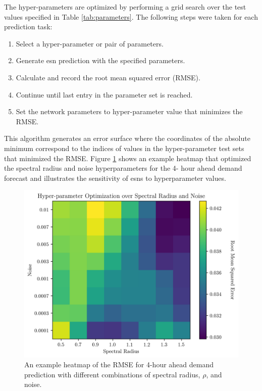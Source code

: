  The hyper-parameters are optimized by performing a grid search over the test
 values specified in Table \ref{tab:parameters}. The following steps were taken
 for each prediction task:
 \begin{enumerate}
   \item Select a hyper-parameter or pair of parameters.
   \item Generate \gls{esn} prediction with the specified parameters.
   \item Calculate and record the root mean squared error (RMSE).
   \item Continue until last entry in the parameter set is reached.
   \item Set the network parameters to hyper-parameter value that minimizes the
   RMSE.
 \end{enumerate}
 This algorithm generates an error surface where the coordinates of the absolute
 minimum correspond to the indices of values in the hyper-parameter test sets
 that minimized the RMSE. Figure \ref{fig:rhoxnoise-demand04} shows an example
 heatmap that optimized the spectral radius and noise hyperparameters for the 4-
 hour ahead demand forecast and illustrates the sensitivity of \glspl{esn} to
 hyperparameter values.

 \begin{figure}[h]
   \includegraphics[width=\columnwidth]{./images/04_demand_rho_noise_loss.png}
   \caption{An example heatmap of the RMSE for 4-hour ahead demand prediction with different combinations of spectral radius, $\rho$, and noise.}
   \label{fig:rhoxnoise-demand04}
 \end{figure}


